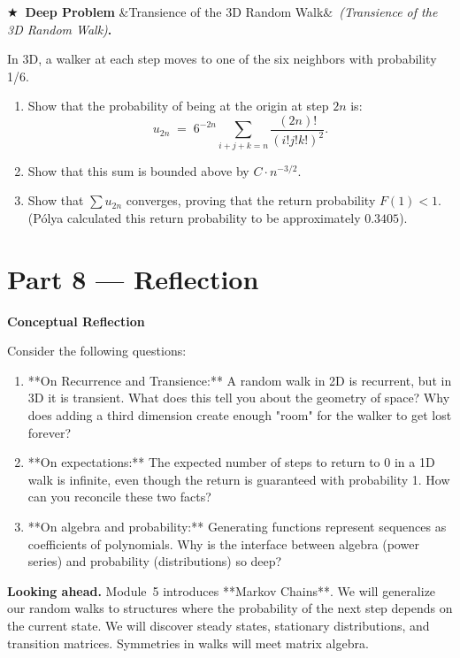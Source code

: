 \documentclass[12pt, a4paper]{article}
\newcounter{problem}
\newcounter{deepproblem}
\newenvironment{deepproblem}[1][]{%
  \refstepcounter{deepproblem}%
  \par\vspace{6pt}%
  \noindent\textbf{\color{NavyBlue}$\bigstar$\ Deep Problem \thedeepproblem}%
  \ifx&#1&\else\ \textit{(#1)}\fi\textbf{.}\enskip
}{\par\vspace{4pt}}
\begin{document}
\begin{deepproblem}[Transience of the 3D Random Walk]
In 3D, a walker at each step moves to one of the six neighbors with probability 1/6.
\begin{enumerate}[label=(\alph*)]
  \item Show that the probability of being at the origin at step $2n$ is:
  \[
    u_{2n} \;=\; 6^{-2n} \sum_{i+j+k=n} \frac{(2n)!}{(i!j!k!)^2}.
  \]
  \item Show that this sum is bounded above by $C \cdot n^{-3/2}$.
  \item Show that $\sum u_{2n}$ converges, proving that the return probability $F(1) < 1$. (Pólya calculated this return probability to be approximately $0.3405$).
\end{enumerate}
\end{deepproblem}

\newpage

\section{Part 8 \texorpdfstring{---}{--} Reflection}

\begin{reflectionbox}
\textbf{Conceptual Reflection}

Consider the following questions:
\begin{enumerate}
  \item **On Recurrence and Transience:** A random walk in 2D is recurrent, but in 3D it is transient. What does this tell you about the geometry of space? Why does adding a third dimension create enough "room" for the walker to get lost forever?
  \item **On expectations:** The expected number of steps to return to 0 in a 1D walk is infinite, even though the return is guaranteed with probability 1. How can you reconcile these two facts?
  \item **On algebra and probability:** Generating functions represent sequences as coefficients of polynomials. Why is the interface between algebra (power series) and probability (distributions) so deep?
\end{enumerate}
\end{reflectionbox}

\medskip
\noindent\textbf{Looking ahead.}
Module~5 introduces **Markov Chains**. We will generalize our random walks to structures where the probability of the next step depends on the current state. We will discover steady states, stationary distributions, and transition matrices. Symmetries in walks will meet matrix algebra.
\end{document}

